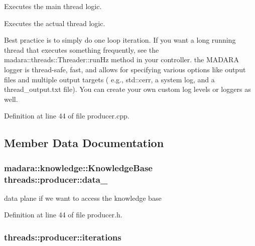 Executes the main thread logic. 

Executes the actual thread logic.

Best practice is to simply do one loop iteration. If you want a long running thread that executes something frequently, see the madara\+::threads\+::\+Threader\+::run\+Hz method in your controller. the M\+A\+D\+A\+RA logger is thread-\/safe, fast, and allows for specifying various options like output files and multiple output targets ( e.\+g., std\+::cerr, a system log, and a thread\+\_\+output.\+txt file). You can create your own custom log levels or loggers as well.

Definition at line 44 of file producer.\+cpp.



\subsection{Member Data Documentation}
\subsubsection[{\texorpdfstring{data\+\_\+}{data_}}]{\setlength{\rightskip}{0pt plus 5cm}madara\+::knowledge\+::\+Knowledge\+Base threads\+::producer\+::data\+\_\+\hspace{0.3cm}{\ttfamily [private]}}\hypertarget{classthreads_1_1producer_a9cd75e08b351b2e4e13f3d5b3b4d9e67}{}\label{classthreads_1_1producer_a9cd75e08b351b2e4e13f3d5b3b4d9e67}


data plane if we want to access the knowledge base 



Definition at line 44 of file producer.\+h.

\subsubsection[{\texorpdfstring{iterations}{iterations}}]{ threads\+::producer\+::iterations\hspace{0.3cm}{\ttfamily [protected]}}\hypertarget{classthreads_1_1producer_ab1c9e99abf599d46572e47eca1299ca2}{}\label{classthreads_1_1producer_ab1c9e99abf599d46572e47eca1299ca2}


